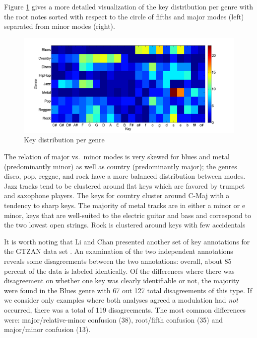 \documentclass{article}
\begin{document}
Figure \ref{fig:KeyDistributionPerGenre} gives a more detailed visualization of the key distribution per genre with the root notes sorted with respect to the circle of fifths and major modes (left) separated from minor modes (right). 
\begin{figure}
    \includegraphics[scale=.2]{graph/key_distribution_colour_legend}
	\caption{Key distribution per genre}
	\label{fig:KeyDistributionPerGenre}
\end{figure}
The relation of major vs.\ minor modes is very skewed for blues and metal (predominantly minor) as well as country (predominantly major); the genres disco, pop, reggae, and rock have a more balanced distribution between modes. Jazz tracks tend to be clustered around flat keys which are favored by trumpet and saxophone players. The keys for country cluster around C-Maj with a tendency to sharp keys. The majority of metal tracks are in either a minor or e minor, keys that are well-suited to the electric guitar and bass and correspond to the two lowest open strings. Rock is clustered around keys with few accidentals


It is worth noting that Li and Chan presented another set of key annotations for the GTZAN data set \cite{li_genre_2011}. An examination of the two independent annotations reveals some disagreements between the two annotations: overall, about $85$ percent of the data is labeled identically. 
Of the differences where there was disagreement on whether one key was clearly identifiable or not, the majority were found in the Blues genre with 67 out 127 total disagreements of this type. If we consider only examples where both analyses agreed a modulation had \textit{not} occurred, there was a total of 119 disagreements. The most common differences were: major/relative-minor confusion (38), root/fifth confusion (35) and major/minor confusion (13).
\end{document}
